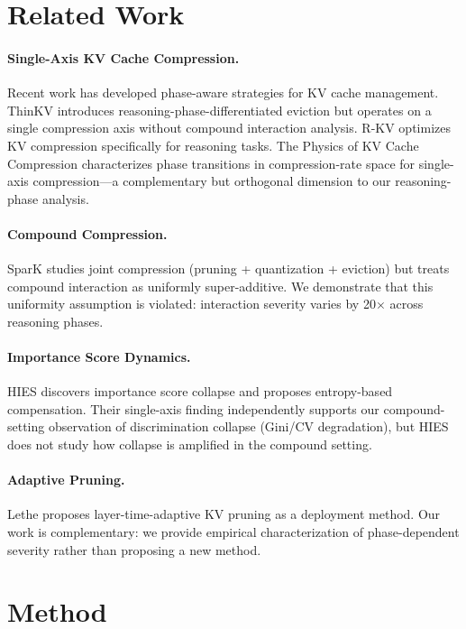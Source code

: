 \documentclass[11pt,a4paper]{article}
\begin{document}
\section{Related Work}

\paragraph{Single-Axis KV Cache Compression.}
Recent work has developed phase-aware strategies for KV cache management. ThinKV \cite{thinkv2025} introduces reasoning-phase-differentiated eviction but operates on a single compression axis without compound interaction analysis. R-KV \cite{rkv2025} optimizes KV compression specifically for reasoning tasks. The Physics of KV Cache Compression \cite{physics_kv2026} characterizes phase transitions in compression-rate space for single-axis compression---a complementary but orthogonal dimension to our reasoning-phase analysis.

\paragraph{Compound Compression.}
SparK \cite{spark2024} studies joint compression (pruning + quantization + eviction) but treats compound interaction as uniformly super-additive. We demonstrate that this uniformity assumption is violated: interaction severity varies by 20$\times$ across reasoning phases.

\paragraph{Importance Score Dynamics.}
HIES \cite{hies2025} discovers importance score collapse and proposes entropy-based compensation. Their single-axis finding independently supports our compound-setting observation of discrimination collapse (Gini/CV degradation), but HIES does not study how collapse is amplified in the compound setting.

\paragraph{Adaptive Pruning.}
Lethe \cite{lethe2026} proposes layer-time-adaptive KV pruning as a deployment method. Our work is complementary: we provide empirical characterization of phase-dependent severity rather than proposing a new method.

\section{Method}
\end{document}
